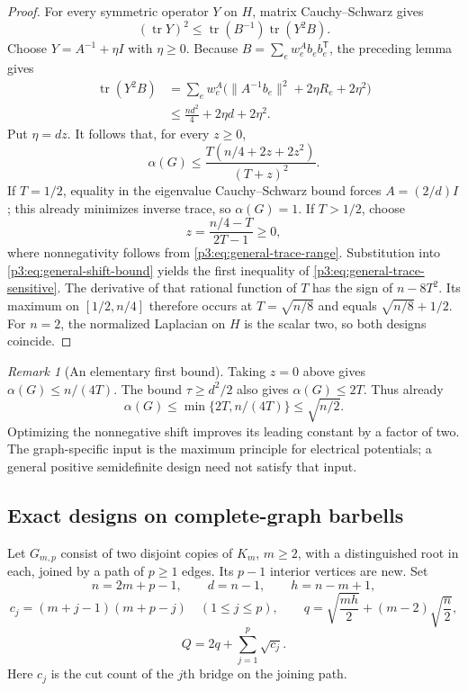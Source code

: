 \documentclass[11pt,a4paper]{article}
\theoremstyle{definition}
\theoremstyle{remark}
\newtheorem{remark}[theorem]{Remark}
\numberwithin{equation}{section}
\begin{document}
\begin{proof}
For every symmetric operator $Y$ on $H$, matrix Cauchy--Schwarz gives
\[
 (\operatorname{tr}Y)^2
 \leq \operatorname{tr}(B^{-1})\operatorname{tr}(Y^2B).
\]
Choose $Y=A^{-1}+\eta I$ with $\eta\geq0$.
Because $B=\sum_e w_e^A b_e b_e^{\mathsf T}$, the preceding lemma gives
\begin{align*}
 \operatorname{tr}(Y^2B)
 &=\sum_e w_e^A
   \bigl(\|A^{-1}b_e\|^2+2\eta R_e+2\eta^2\bigr)\\
 &\leq\frac{nd^2}{4}+2\eta d+2\eta^2.
\end{align*}
Put $\eta=dz$.  It follows that, for every $z\geq0$,
\begin{equation}\label{p3:eq:general-shift-bound}
 \alpha(G)\leq
 \frac{T(n/4+2z+2z^2)}{(T+z)^2}.
\end{equation}
If $T=1/2$, equality in the eigenvalue Cauchy--Schwarz bound forces
$A=(2/d)I$; this already minimizes inverse trace, so $\alpha(G)=1$.
If $T>1/2$, choose
\[
 z=\frac{n/4-T}{2T-1}\geq0,
\]
where nonnegativity follows from
\eqref{p3:eq:general-trace-range}.
Substitution into \eqref{p3:eq:general-shift-bound} yields the first
inequality of \eqref{p3:eq:general-trace-sensitive}.
The derivative of that rational function of $T$ has the sign of
$n-8T^2$.  Its maximum on $[1/2,n/4]$ therefore occurs at
$T=\sqrt{n/8}$ and equals $\sqrt{n/8}+1/2$.
For $n=2$, the normalized Laplacian on $H$ is the scalar two, so
both designs coincide.
\end{proof}

\begin{remark}[An elementary first bound]
Taking $z=0$ above gives $\alpha(G)\leq n/(4T)$.
The bound $\tau\geq d^2/2$ also gives $\alpha(G)\leq2T$.
Thus already
\[
 \alpha(G)\leq\min\{2T,n/(4T)\}\leq\sqrt{n/2}.
\]
Optimizing the nonnegative shift improves its leading constant by a
factor of two.  The graph-specific input is the maximum principle
for electrical potentials; a general positive semidefinite design
need not satisfy that input.
\end{remark}

\subsection{Exact designs on complete-graph barbells}

Let $G_{m,p}$ consist of two disjoint copies of $K_m$, $m\geq2$,
with a distinguished root in each, joined by a path of $p\geq1$
edges.  Its $p-1$ interior vertices are new.  Set
\[
 n=2m+p-1,\qquad d=n-1,\qquad h=n-m+1,
\]
\[
 c_j=(m+j-1)(m+p-j)\quad(1\leq j\leq p),
 \qquad
 q=\sqrt{\frac{mh}{2}}+(m-2)\sqrt{\frac n2},
\]
\[
 Q=2q+\sum_{j=1}^p\sqrt{c_j}.
\]
Here $c_j$ is the cut count of the $j$th bridge on the joining path.
\end{document}
